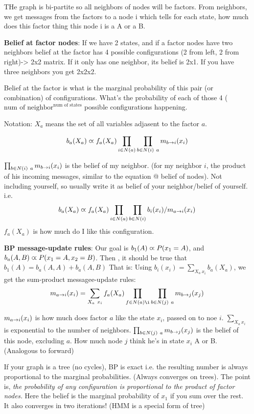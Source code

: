 THe graph is bi-partite so all neighbors of nodes will be
factors. From neighbors, we get messages from the factors to a node i
which tells for each state, how much does this factor thing this node
i is a A or a B.

\textbf{Belief at factor nodes}:
If we have 2 states, and if a factor nodes have two neighbors  belief at the factor has
4 possible configurations (2 from left, 2 from right)-> 2x2
matrix. If it only has one neighbor, its belief is 2x1. If you have
three neighbors you get 2x2x2.

Belief at the factor is what is the marginal probability of this pair
(or combination) of configurations. What's the probability of each of
those 4 ($\text{num of neighbor}^{\text{num of states}}$ possible configurations happening.

Notation: $X_a$ means the set of all variables adjasent to the factor
$a$.

$$b_a(X_a) \varpropto f_a(X_a)\prod_{i\in N(a)}\prod_{b\in N(i)\ a}m_{b\rightarrow i}(x_i)$$

$\prod_{b\in N(i)\ a}m_{b\rightarrow i}(x_i)$ is the belief of my
neighbor. (for my neighbor $i$, the product of his incoming messages,
similar to the equation @ belief of nodes). Not including yourself, so
usually write it as belief of your neighbor/belief of yourself. i.e.
$$b_a(X_a) \varpropto f_a(X_a)\prod_{i\in N(a)}\prod_{b\in
  N(i)}b_i(x_i)/m_{a\rightarrow i}(x_i)$$
$f_a(X_a)$ is how much do I like this configuration.

\textbf{BP message-update rules}: 
Our goal is $b_1(A) \varpropto P(x_1=A)$, and $b_a(A,B)\varpropto P(x_1=A,
x_2=B)$. Then , it should be true that $b_1(A) = b_a(A,A) + b_a(A,B)$
That is:
Using $b_i(x_i) =
\sum_{X_a\ x_i}b_a(X_a)$, we get the 
sum-product
 messagee-update rules:
$$m_{a\rarr i}(x_i) = \sum_{X_a\ x_i}f_a(X_a)\prod_{f\in
  N(a)\i}\prod_{b\in N(j)\ a}m_{b\rarr j}(x_j)$$

$m_{a\rightarrow i}(x_i)$ is how much does factor $a$ like the state $x_i$,
passed on to noe $i$.
$\sum_{X_a\ x_i}$ is exponential to the number of neighbors.
$\prod_{b\in N(j)\ a}m_{b\rightarrow j}(x_j)$ is the belief of this node,
excluding $a$. How much node $j$ think he's in state $x_i$ A or
B. (Analogous to forward)

If your graph is a tree (no cycles), BP is exact i.e. the resulting number is
always proportional to the marginal probabilities. (Always converges
on trees). The point is,\emph{ the probability of any configuration is
proportional to the product of factor nodes.} Here the belief is the
marginal probability of $x_1$ if you sum over the rest. It also
converges in two iterations!
(HMM is a special form of tree)

